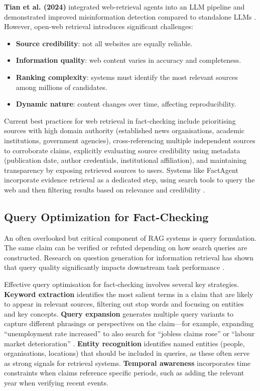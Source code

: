 \documentclass[12pt,a4paper]{article}
\begin{document}
\textbf{Tian et al. (2024)} integrated web-retrieval agents into an LLM pipeline and demonstrated improved misinformation detection compared to standalone LLMs \citep{tian2024webagents}. However, open-web retrieval introduces significant challenges:

\begin{itemize}
    \item \textbf{Source credibility}: not all websites are equally reliable.
    \item \textbf{Information quality}: web content varies in accuracy and completeness.
    \item \textbf{Ranking complexity}: systems must identify the most relevant sources among millions of candidates.
    \item \textbf{Dynamic nature}: content changes over time, affecting reproducibility.
\end{itemize}

Current best practices for web retrieval in fact-checking include prioritising sources with high domain authority (established news organisations, academic institutions, government agencies), cross-referencing multiple independent sources to corroborate claims, explicitly evaluating source credibility using metadata (publication date, author credentials, institutional affiliation), and maintaining transparency by exposing retrieved sources to users. Systems like FactAgent incorporate evidence retrieval as a dedicated step, using search tools to query the web and then filtering results based on relevance and credibility \citep{hysonlab2025factagent}.

\subsection{Query Optimization for Fact-Checking}

An often overlooked but critical component of RAG systems is query formulation. The same claim can be verified or refuted depending on how search queries are constructed. Research on question generation for information retrieval has shown that query quality significantly impacts downstream task performance \citep{ma2025guided, hassan2021claimbuster}.

Effective query optimisation for fact-checking involves several key strategies. \textbf{Keyword extraction} identifies the most salient terms in a claim that are likely to appear in relevant sources, filtering out stop words and focusing on entities and key concepts. \textbf{Query expansion} generates multiple query variants to capture different phrasings or perspectives on the claim—for example, expanding ``unemployment rate increased'' to also search for ``jobless claims rose'' or ``labour market deterioration'' \citep{lewis2020retrieval}. \textbf{Entity recognition} identifies named entities (people, organisations, locations) that should be included in queries, as these often serve as strong signals for retrieval systems. \textbf{Temporal awareness} incorporates time constraints when claims reference specific periods, such as adding the relevant year when verifying recent events.
\end{document}
